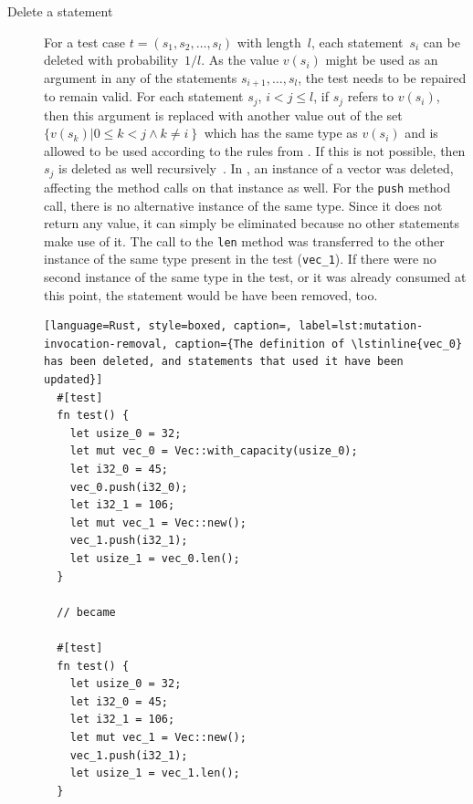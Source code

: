 \documentclass[paper=a4,%
  twoside,%
  BCOR4mm,%
  abstract=true,%
  toc=bibliography,%
  chapterprefix=true,%
  toc=bibliographynumbered,%
  open=right,%
  english,%
  pagesize=pdftex]{scrreprt}
\begin{document}
\begin{description}
  \item[Delete a statement] For a test case $t = (s_1, s_2, \dots, s_l)$ with length~$l$, each statement~$s_i$ can be deleted with probability~$1/l$. As the value $v(s_i)$ might be used as an argument in any of the statements $s_{i+1}, \dots, s_l$, the test needs to be repaired to remain valid. For each statement $s_j$, $i < j \leq l$, if $s_j$ refers to $v(s_i)$, then this argument is replaced with another value out of the set $\{v(s_k) \left| 0 \leq k < j \wedge k \neq i \right\}$ which has the same type as $v(s_i)$ and is allowed to be used according to the rules from . If this is not possible, then $s_j$ is deleted as well recursively~\cite{Fraser2012}. In , an instance of a vector was deleted, affecting the method calls on that instance as well. For the \lstinline{push} method call, there is no alternative instance of the same type. Since it does not return any value, it can simply be eliminated because no other statements make use of it. The call to the \lstinline{len} method was transferred to the other instance of the same type present in the test (\lstinline{vec_1}). If there were no second instance of the same type in the test, or it was already consumed at this point, the statement would be have been removed, too.

  \begin{lstlisting}[language=Rust, style=boxed, caption=, label=lst:mutation-invocation-removal, caption={The definition of \lstinline{vec_0} has been deleted, and statements that used it have been updated}]
  #[test]
  fn test() {
    let usize_0 = 32;
    let mut vec_0 = Vec::with_capacity(usize_0);
    let i32_0 = 45;
    vec_0.push(i32_0);
    let i32_1 = 106;
    let mut vec_1 = Vec::new();
    vec_1.push(i32_1);
    let usize_1 = vec_0.len();
  }

  // became

  #[test]
  fn test() {
    let usize_0 = 32;
    let i32_0 = 45;
    let i32_1 = 106;
    let mut vec_1 = Vec::new();
    vec_1.push(i32_1);
    let usize_1 = vec_1.len();
  }
  \end{lstlisting}

\end{description}
\end{document}
